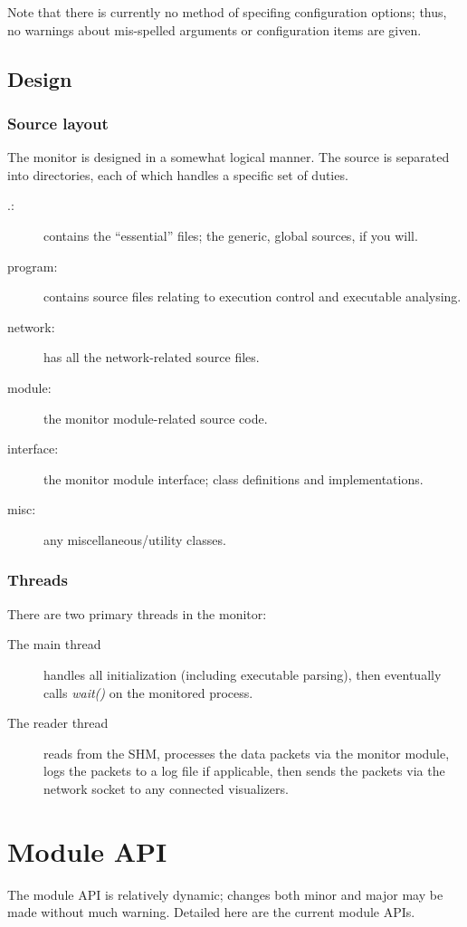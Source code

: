 \documentclass[a4paper,10pt]{report}
\begin{document}
Note that there is currently no method of specifing configuration options; thus, no warnings about mis-spelled arguments or
configuration items are given.

\section{Design}
\subsection{Source layout}
The monitor is designed in a somewhat logical manner. The source is separated into directories, each of which handles a specific
set of duties.

\begin{description}
 \item[.:] contains the ``essential'' files; the generic, global sources, if you will.
 \item[program:] contains source files relating to execution control and executable analysing.
 \item[network:] has all the network-related source files.
 \item[module:] the monitor module-related source code.
 \item[interface:] the monitor module interface; class definitions and implementations.
 \item[misc:] any miscellaneous/utility classes.
\end{description}

\subsection{Threads}

There are two primary threads in the monitor:
\begin{description}
 \item[\textnormal{The} main thread] handles all initialization (including executable parsing), then eventually calls \emph{wait()} on
  the monitored process.
 \item[\textnormal{The} reader thread] reads from the SHM, processes the data packets via the monitor module, logs the packets to a log
  file if applicable, then sends the packets via the network socket to any connected visualizers.
\end{description}

\chapter{Module API}
The module API is relatively dynamic; changes both minor and major may be made without much warning. Detailed here are the
current module APIs.
\end{document}
